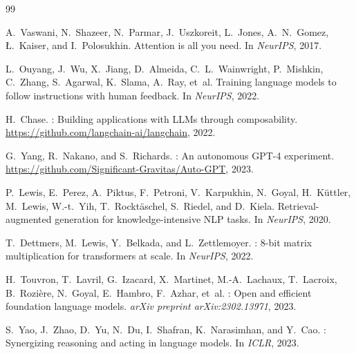 \documentclass[11pt,twocolumn]{article}
\begin{document}
\begin{thebibliography}{99}

A.~Vaswani, N.~Shazeer, N.~Parmar, J.~Uszkoreit, L.~Jones, A.~N.~Gomez,
\L.~Kaiser, and I.~Polosukhin.
\newblock Attention is all you need.
\newblock In \emph{NeurIPS}, 2017.

L.~Ouyang, J.~Wu, X.~Jiang, D.~Almeida, C.~L.~Wainwright, P.~Mishkin,
C.~Zhang, S.~Agarwal, K.~Slama, A.~Ray, et~al.
\newblock Training language models to follow instructions with human feedback.
\newblock In \emph{NeurIPS}, 2022.

H.~Chase.
: Building applications with {LLMs} through composability.
\newblock \url{https://github.com/langchain-ai/langchain}, 2022.

G.~Yang, R.~Nakano, and S.~Richards.
: An autonomous {GPT-4} experiment.
\newblock \url{https://github.com/Significant-Gravitas/Auto-GPT}, 2023.

P.~Lewis, E.~Perez, A.~Piktus, F.~Petroni, V.~Karpukhin, N.~Goyal,
H.~K\"uttler, M.~Lewis, W.-t.~Yih, T.~Rockt\"aschel, S.~Riedel, and
D.~Kiela.
\newblock Retrieval-augmented generation for knowledge-intensive {NLP} tasks.
\newblock In \emph{NeurIPS}, 2020.

T.~Dettmers, M.~Lewis, Y.~Belkada, and L.~Zettlemoyer.
: 8-bit matrix multiplication for transformers at scale.
\newblock In \emph{NeurIPS}, 2022.

H.~Touvron, T.~Lavril, G.~Izacard, X.~Martinet, M.-A.~Lachaux,
T.~Lacroix, B.~Rozi\`ere, N.~Goyal, E.~Hambro, F.~Azhar, et~al.
: Open and efficient foundation language models.
\newblock \emph{arXiv preprint arXiv:2302.13971}, 2023.

S.~Yao, J.~Zhao, D.~Yu, N.~Du, I.~Shafran, K.~Narasimhan, and Y.~Cao.
: Synergizing reasoning and acting in language models.
\newblock In \emph{ICLR}, 2023.

\end{thebibliography}
\end{document}
